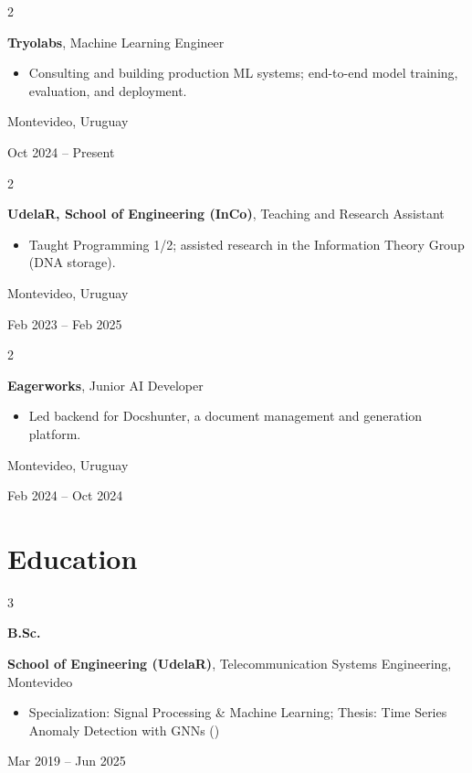 \documentclass[10pt, letterpaper]{article}
\newenvironment{highlights}{
    \begin{itemize}[
        topsep=0.10 cm,
        parsep=0.10 cm,
        partopsep=0pt,
        itemsep=0pt,
        leftmargin=0.4 cm + 10pt
    ]
}{
    \end{itemize}
} %
\newenvironment{twocolentry}[2][]{
    \onecolentry
    \def\secondColumn{#2}
    \setcolumnwidth{\fill, 4.5 cm}
    \begin{paracol}{2}
}{
    \switchcolumn \raggedleft \secondColumn
    \end{paracol}
    \endonecolentry
} %
\newenvironment{threecolentry}[3][]{
    \onecolentry
    \def\thirdColumn{#3}
    \setcolumnwidth{1 cm, \fill, 4.5 cm}
    \begin{paracol}{3}
    {\raggedright #2} \switchcolumn
}{
    \switchcolumn \raggedleft \thirdColumn
    \end{paracol}
    \endonecolentry
} %
\let\hrefWithoutArrow\href
\renewcommand{\href}[2]{\hrefWithoutArrow{#1}{\ifthenelse{\equal{#2}{}}{ }{#2 }\raisebox{.15ex}{\footnotesize \faExternalLink*}}}
\begin{document}
        \begin{twocolentry}{
            Montevideo, Uruguay

        Oct 2024 -- Present
        }
            \textbf{Tryolabs}, Machine Learning Engineer
            \begin{highlights}
                \item Consulting and building production ML systems; end-to-end model training, evaluation, and deployment.
            \end{highlights}
        \end{twocolentry}

        \vspace{0.2 cm}

        \begin{twocolentry}{
            Montevideo, Uruguay

        Feb 2023 -- Feb 2025
        }
            \textbf{UdelaR, School of Engineering (InCo)}, Teaching and Research Assistant
            \begin{highlights}
                \item Taught Programming 1/2; assisted research in the Information Theory Group (DNA storage).
            \end{highlights}
        \end{twocolentry}

        \vspace{0.2 cm}

        \begin{twocolentry}{
            Montevideo, Uruguay

        Feb 2024 -- Oct 2024
        }
            \textbf{Eagerworks}, Junior AI Developer
            \begin{highlights}
                \item Led backend for Docshunter, a document management and generation platform.
            \end{highlights}
        \end{twocolentry}

    \section{Education}

        \begin{threecolentry}{\textbf{B.Sc.}}{
            Mar 2019 -- Jun 2025
        }
            \textbf{School of Engineering (UdelaR)}, Telecommunication Systems Engineering, Montevideo
            \begin{highlights}
                \item Specialization: Signal Processing \& Machine Learning; Thesis: Time Series Anomaly Detection with GNNs (\href{https://github.com/GraGODs/GraGOD}{GraGOD})
            \end{highlights}
        \end{threecolentry}
\end{document}
